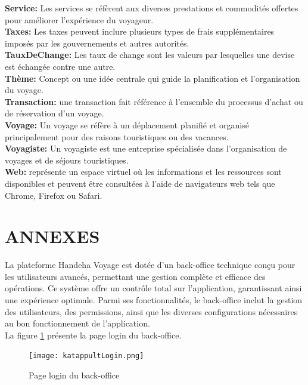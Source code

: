 \documentclass[12pt]{report}
\begin{document}
			\textbf{Service:} Les services se réfèrent aux diverses prestations et commodités offertes pour améliorer l'expérience du voyageur.\\
			\textbf{Taxes:} Les taxes peuvent inclure plusieurs types de frais supplémentaires imposés par les gouvernements et autres autorités.\\
			\textbf{TauxDeChange:} Les taux de change sont les valeurs par lesquelles une devise est échangée contre une autre.\\
			\textbf{Thème:} Concept ou une idée centrale qui guide la planification et l'organisation du voyage.\\
			\textbf{Transaction:} une transaction fait référence à l'ensemble du processus d'achat ou de réservation d'un voyage.\\
			\textbf{Voyage:} Un voyage se réfère à un déplacement planifié et organisé principalement pour des raisons touristiques ou des vacances.\\
			\textbf{Voyagiste:} Un voyagiste est une entreprise spécialisée dans l'organisation de voyages et de séjours touristiques.\\
			\textbf{Web:} représente un espace virtuel où les informations et les ressources sont disponibles et peuvent être consultées à l'aide de navigateurs web tels que Chrome, Firefox ou Safari.\\


			\chapter*{ANNEXES}
			
			\hspace{15pt} La plateforme Handeha Voyage est dotée d'un back-office technique conçu pour les utilisateurs avancés, permettant une gestion complète et efficace des opérations. Ce système offre un contrôle total sur l'application, garantissant ainsi une expérience optimale. Parmi ses fonctionnalités, le back-office inclut la gestion des utilisateurs, des permissions, ainsi que les diverses configurations nécessaires au bon fonctionnement de l'application.\\

			La figure \ref{fig:katappultLogin} présente la page login du back-office.

			\begin{figure}[h]
				\centering
				\texttt{[image: katappultLogin.png]}
				\caption{Page login du back-office}
				\label{fig:katappultLogin}
			\end{figure}
			\FloatBarrier
\end{document}
